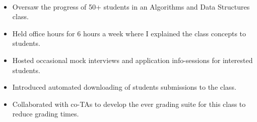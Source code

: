 \\
\begin{itemize}
    \item Oversaw the progress of 50+ students in an Algorithms and Data Structures class.
    \item Held office hours for 6 hours a week where I explained the class concepts to students.
    \item Hosted occasional mock interviews and application info-sessions for interested students.
    \item Introduced automated downloading of students\textquotesingle{} submissions to the class.
    \item Collaborated with co-TAs to develop the  ever grading suite for this class to reduce grading times.
\end{itemize}
